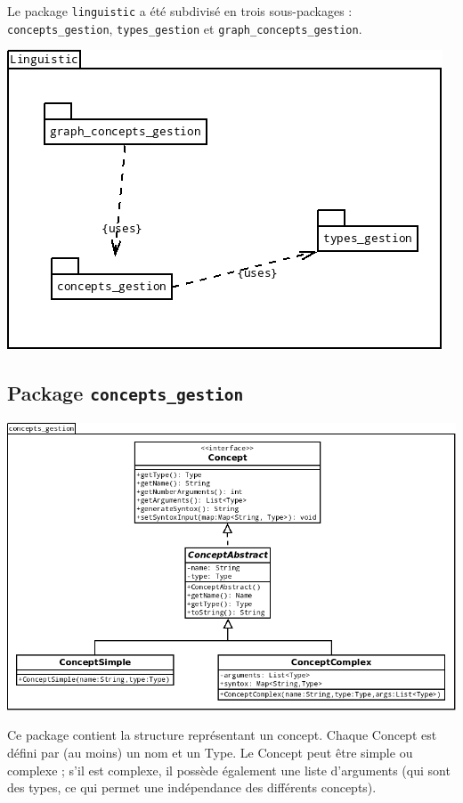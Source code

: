 \documentclass[12pt]{report}
\begin{document}
Le package \texttt{linguistic} a été subdivisé en trois sous-packages : \texttt{concepts\_gestion}, \texttt{types\_gestion} et \texttt{graph\_concepts\_gestion}.

\begin{center}
\includegraphics[scale=0.5]{DiagLinguisticPackages.png}
\end{center}

\subsection{Package \texttt{concepts\_gestion}}

\begin{center}
\includegraphics[scale=0.5]{DiagLinguistic_concepts_gestion.png}
\end{center}

Ce package contient la structure représentant un concept. Chaque Concept est défini par (au moins) un nom et un Type. Le Concept peut être simple ou complexe ; s'il est complexe, il possède également une liste d'arguments (qui sont des types, ce qui permet une indépendance des différents concepts). %
\end{document}
